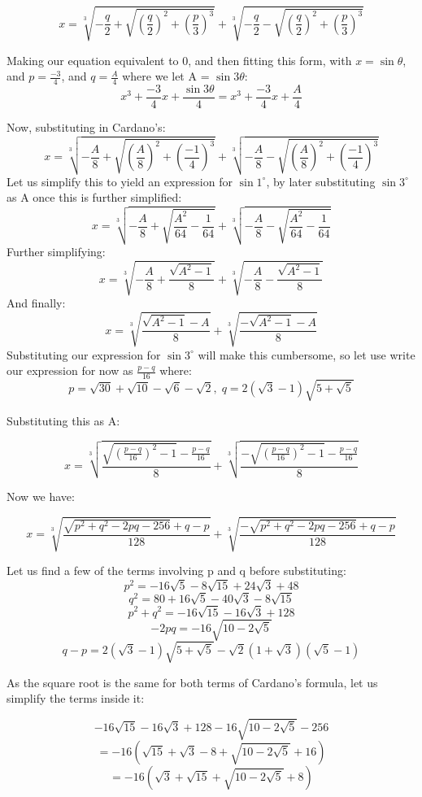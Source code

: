 \documentclass[12pt]{article}
\begin{document}
\[
x = \sqrt[3]{-\frac{q}{2} + \sqrt{\left(\frac{q}{2}\right)^2 + \left(\frac{p}{3}\right)^3}} + \sqrt[3]{-\frac{q}{2} - \sqrt{\left(\frac{q}{2}\right)^2 + \left(\frac{p}{3}\right)^3}}
\]

Making our equation equivalent to 0, and then fitting this form, with $x=\sin{\theta}$, and $p=\frac{-3}{4}$, and $q=\frac{A}{4}$ where we let A = $\sin{3\theta}$:
\[
x^3+\frac{-3}{4}x+\frac{\sin{3\theta}}{4}=x^3+\frac{-3}{4}x+\frac{A}{4}
\]

Now, substituting in Cardano's:
\[
x = \sqrt[3]{-\frac{A}{8} + \sqrt{\left(\frac{A}{8}\right)^2 + \left(\frac{-1}{4}\right)^3}} + \sqrt[3]{-\frac{A}{8} - \sqrt{\left(\frac{A}{8}\right)^2 + \left(\frac{-1}{4}\right)^3}}
\]
Let us simplify this to yield an expression for $\sin{1^{\circ}}$, by later substituting $\sin{3^{\circ}}$ as A once this is further simplified:
\[
x = \sqrt[3]{-\frac{A}{8} + \sqrt{\frac{A^2}{64} - \frac{1}{64}}} + \sqrt[3]{-\frac{A}{8} - \sqrt{\frac{A^2}{64} - \frac{1}{64}}}
\]
Further simplifying:
\[
x = \sqrt[3]{-\frac{A}{8} + \frac{\sqrt{A^2-1}}{8}} + \sqrt[3]{-\frac{A}{8} - \frac{\sqrt{A^2-1}}{8}}
\]
And finally:
\[
x = \sqrt[3]{\frac{\sqrt{A^2-1}-A}{8}} + \sqrt[3]{\frac{-\sqrt{A^2-1}-A}{8}}
\]
Substituting our expression for $\sin{3^{\circ}}$ will make this cumbersome, so let use write our expression for now as $\frac{p-q}{16}$ where:
\[
p=\sqrt{30}+\sqrt{10}-\sqrt{6}-\sqrt{2},\;q=2(\sqrt{3}-1)\sqrt{5+\sqrt{5}}
\]

Substituting this as A:

\[ x = \sqrt[3]{\frac{\sqrt{\left(\frac{p-q}{16}\right)^2-1}-\frac{p-q}{16}}{8}} + \sqrt[3]{\frac{-\sqrt{\left(\frac{p-q}{16}\right)^2-1}-\frac{p-q}{16}}{8}} \]

Now we have:

\[ x = \sqrt[3]{\frac{\sqrt{p^2+q^2-2pq-256}+q-p}{128}} + \sqrt[3]{\frac{-\sqrt{p^2+q^2-2pq-256}+q-p}{128}} \]

Let us find a few of the terms involving p and q  before substituting:
\[ p^2 = -16\sqrt{5} - 8\sqrt{15} + 24\sqrt{3} + 48 \]
\[q^2 = 80 + 16\sqrt{5} - 40\sqrt{3} - 8\sqrt{15}\]
\[ p^2 + q^2 = -16\sqrt{15} - 16\sqrt{3} + 128 \]
\[ -2pq = -16\sqrt{10-2\sqrt{5}}\]
\[ q-p = 2 (\sqrt{3} - 1) \sqrt{5 + \sqrt{5}} - \sqrt{2} (1 + \sqrt{3}) (\sqrt{5} - 1) \]

As the square root is the same for both terms of Cardano's formula, let us simplify the terms inside it:

\[-16\sqrt{15} - 16\sqrt{3} + 128 -16\sqrt{10-2\sqrt{5}}-256\]
\[= -16(\sqrt{15} + \sqrt{3} - 8 +\sqrt{10-2\sqrt{5}}+16)\]
\[= -16(\sqrt{3}+\sqrt{15} + \sqrt{10-2\sqrt{5}}+8)\]
\end{document}
